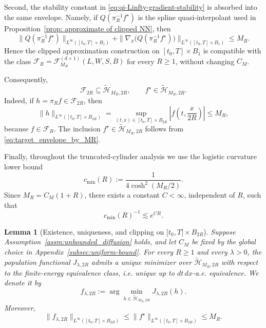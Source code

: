 \documentclass[11pt]{article}
\theoremstyle{plain}
\newtheorem{lemma}[theorem]{Lemma}
\theoremstyle{definition}
\theoremstyle{remark}
\begin{document}
Second, the stability constant in \eqref{eq:qi-Linfty-gradient-stability} is
absorbed into the same envelope. Namely,
if \(Q(\pi_R^{-1}f^\star)\) is the spline quasi-interpolant used in
Proposition~\ref{prop: approximate of clipped NN}, then
\begin{equation}
\label{eq:spline_envelope_by_MR}
\|Q(\pi_R^{-1}f^\star)\|_{L^\infty([t_0,T]\times B_1)}
+
\|\nabla_{\bar x}\bigl(Q(\pi_R^{-1}f^\star)\bigr)\|_{L^\infty([t_0,T]\times B_1)}
\le M_R.
\end{equation}
Hence the clipped approximation construction on \([t_0,T]\times B_1\) is compatible with
the class \(\mathcal F_R=\mathcal F_{M_R}^{(d+1)}(L,W,S,B)\) for every
\(R\ge1\), without changing \(C_M\).

Consequently,
\begin{equation}
\label{eq:F2R-subset-Htilde-MR}
\mathcal F_{2R}\subseteq\widetilde{\mathcal H}_{M_R,2R},
\qquad
f^\star\in\widetilde{\mathcal H}_{M_R,2R}.
\end{equation}
Indeed, if \(h=\pi_R f\in\mathcal F_{2R}\), then
\[
\|h\|_{L^\infty([t_0,T]\times B_{2R})}
=
\sup_{(t,x)\in [t_0,T]\times B_{2R}}
\left|f\left(t,\frac{x}{2R}\right)\right|
\le M_R,
\]
because \(f\in\mathcal F_R\). The inclusion
\(f^\star\in\widetilde{\mathcal H}_{M_R,2R}\) follows from
\eqref{eq:target_envelope_by_MR}.

Finally, throughout the truncated-cylinder analysis we use the logistic
curvature lower bound
\begin{equation}
\label{eq:cmin_R_def}
c_{\min}(R):=
\frac{1}{4\cosh^2(M_R/2)}.
\end{equation}
Since \(M_R=C_M(1+R)\), there exists a constant \(C<\infty\), independent of
\(R\), such that
\begin{equation}
\label{eq:cmin_R_growth}
c_{\min}(R)^{-1}\lesssim e^{CR}.
\end{equation}

\begin{lemma}[Existence, uniqueness, and clipping on \(\lbrack t_0,T\rbrack\times B_{2R}\)]
\label{lem:C2-existence-uniqueness}
Suppose Assumption~\ref{assm:unbounded_diffusion} holds, and let
\(C_M\) be fixed by the global choice in
Appendix~\ref{subsec:uniform-bound}. For every \(R\ge1\) and every
\(\lambda>0\), the population functional \(J_{\lambda,2R}\) admits a unique
minimizer over \(\widetilde{\mathcal H}_{M_R,2R}\) with respect to the
finite-energy equivalence class, i.e. unique up to \(dt\,dx\)-a.e.
equivalence. We denote it by
\[
f_{\lambda,2R}:=
\arg\min_{h\in\widetilde{\mathcal H}_{M_R,2R}} J_{\lambda,2R}(h).
\]
Moreover,
\begin{equation}
\label{eq:C2_clipping_bound}
\|f_{\lambda,2R}\|_{L^\infty([t_0,T]\times B_{2R})}
\le
\|f^\star\|_{L^\infty([t_0,T]\times B_{2R})}
\le
M_R.
\end{equation}
\end{lemma}
\end{document}
